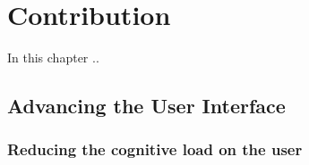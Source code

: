 \chapter{Contribution}
In this chapter ..

\section{Advancing the User Interface}

	\subsection{Reducing the cognitive load on the user}
	
